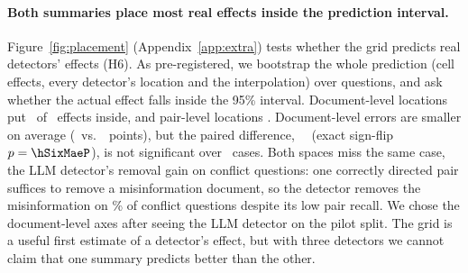 \paragraph{Both summaries place most real effects inside the prediction interval.}
Figure~\ref{fig:placement} (Appendix~\ref{app:extra}) tests
whether the grid predicts real detectors' effects (H6). As pre-registered, we bootstrap the whole prediction (cell effects, every detector's
location and the interpolation) over questions, and ask whether the actual effect falls inside the 95\% interval.
Document-level locations put \hSixDocIn\ of \hSixN\ effects inside, and pair-level locations
\hSixPairIn. Document-level errors are smaller on
average (\hSixDocMae\ vs.\ \hSixPairMae\ points), but the paired difference, \hSixMaeDiff\ \hSixMaeDiffCI\ (exact
sign-flip $p=\hSixMaeP$), is not significant over \hSixN\ cases. Both spaces miss the same case, the LLM detector's
removal gain on conflict questions: one correctly directed pair suffices to remove a misinformation document, so the
detector removes the misinformation on \misGoneLlm\% of conflict questions despite its low pair recall. We chose the
document-level axes after seeing the LLM detector on the pilot split. The grid is a useful first estimate of a
detector's effect, but with three detectors we cannot claim that one summary predicts better than the other.

